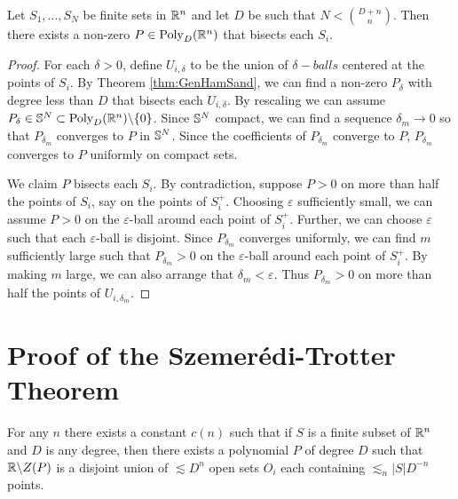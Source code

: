 \begin{corollary}
    Let $S_1, \dots , S_N$ be finite sets in $\mathbb R^n$ and let $D$ be such that $N < {{D+n}\choose{n}}$. 
    Then there exists a non-zero $P\in \text{Poly}_D (\mathbb R^n)$ that bisects each $S_i$.  \label{thm:FiniteHamSandwich} 
\end{corollary}

\begin{proof}
    For each $\delta>0$, define $U_{i, \delta}$ to be the union of $\delta-balls$ centered at the points of $S_i$. 
    By Theorem \ref{thm:GenHamSand}, we can find a non-zero $P_{\delta}$ with degree less than $D$ that bisects each $U_{i, \delta}$. 
    By rescaling we can assume $P_{\delta} \in \mathbb S^N \subset \text{Poly}_D (\mathbb R^n) \backslash \{0\}$.
    Since $\mathbb S^N$ compact, we can find a sequence $\delta_m \to 0$ so that $P_{\delta_{m}}$ converges to $P$ in $\mathbb S^N$.
    Since the coefficients of $P_{\delta_{m}}$ converge to $P$, $P_{\delta_{m}}$ converges to $P$ uniformly on compact sets.

    We claim $P$ bisects each $S_i$. 
    By contradiction, suppose $P>0$ on more than half the points of $S_i$, say on the points of $S_i^+$. 
    Choosing $\varepsilon$ sufficiently small, we can assume $P>0$ on the $\varepsilon$-ball around each point of $S_i^+$.
    Further, we can choose $\varepsilon$ such that each $\varepsilon$-ball is disjoint. 
    Since $P_{\delta_{m}}$ converges uniformly, we can find $m$ sufficiently large such that $P_{\delta_{m}}>0$ 
    on the $\varepsilon$-ball around each point of $S_i^+$.
    By making $m$ large, we can also arrange that $\delta_m < \varepsilon$.
    Thus $P_{\delta_{m}} > 0$ on more than half the points of $U_{i, \delta_{m}}$.
\end{proof}
\section{Proof of the Szemerédi-Trotter Theorem}
\begin{theorem}
   For any $n$ there exists a constant $c(n)$ such that if $S$ is a finite subset of $\mathbb R^n$ and $D$ is any degree, then there exists
   a polynomial $P$ of degree $D$ such that $\mathbb R \backslash Z(P)$ is a disjoint union of $\lesssim D^n$ open sets $O_i$ each containing
   $\lesssim_n |S|D^{-n}$ points. \label{thm:PolyPartioning}
\end{theorem}

